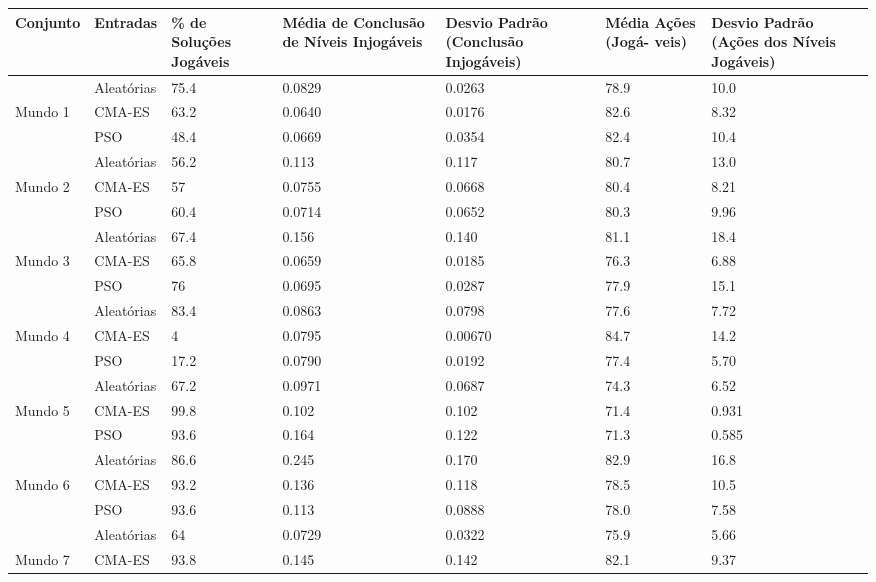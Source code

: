 \begin{table}[ht]
    \centering
    \begin{tabular}{|p{2cm}|p{2cm}|p{2cm}|p{2cm}|p{2cm}|p{1cm}|p{2cm}|}
            \hline
       \textbf{Conjunto} & \textbf{Entradas} & \textbf{\% de Soluções Jogáveis} & \textbf{Média de Conclusão de Níveis Injogáveis} & \textbf{Desvio Padrão (Conclusão Injogáveis)} & \textbf{Média Ações (Jogá- veis)} & \textbf{Desvio Padrão (Ações dos Níveis Jogáveis)} \\
            \hline
        & Aleatórias & 75.4 & 0.0829 & 0.0263 & 78.9 & 10.0 \\
        Mundo 1 & CMA-ES & 63.2 & 0.0640 & 0.0176 & 82.6 & 8.32 \\
        & PSO & 48.4 & 0.0669 & 0.0354 & 82.4 & 10.4 \\
            \hline
        & Aleatórias & 56.2 & 0.113 & 0.117 & 80.7 & 13.0 \\
        Mundo 2 & CMA-ES & 57 & 0.0755 & 0.0668 & 80.4 & 8.21 \\
        &  PSO & 60.4 & 0.0714 & 0.0652 & 80.3 & 9.96 \\
            \hline
        & Aleatórias & 67.4 & 0.156 & 0.140 & 81.1 & 18.4 \\
        Mundo 3 & CMA-ES & 65.8 & 0.0659 & 0.0185 & 76.3 & 6.88 \\
        & PSO & 76 & 0.0695 & 0.0287 & 77.9 & 15.1 \\
            \hline
        & Aleatórias & 83.4 & 0.0863 & 0.0798 & 77.6 & 7.72 \\
        Mundo 4 & CMA-ES & 4 & 0.0795 & 0.00670 & 84.7 & 14.2 \\
        & PSO & 17.2 & 0.0790 & 0.0192 & 77.4 & 5.70 \\
            \hline
        & Aleatórias & 67.2 & 0.0971 & 0.0687 & 74.3 & 6.52 \\
        Mundo 5 & CMA-ES & 99.8 & 0.102 & 0.102 & 71.4 & 0.931 \\
        & PSO & 93.6 & 0.164 & 0.122 & 71.3 & 0.585 \\
            \hline
        & Aleatórias & 86.6 & 0.245 & 0.170 & 82.9 & 16.8 \\
        Mundo 6 & CMA-ES & 93.2 & 0.136 & 0.118 & 78.5 & 10.5 \\
        & PSO & 93.6 & 0.113 & 0.0888 & 78.0 & 7.58 \\
            \hline
        & Aleatórias & 64 & 0.0729 & 0.0322 & 75.9 & 5.66 \\
        Mundo 7 & CMA-ES & 93.8 & 0.145 & 0.142 & 82.1 & 9.37 \\

\end{tabular}
\end{table}
